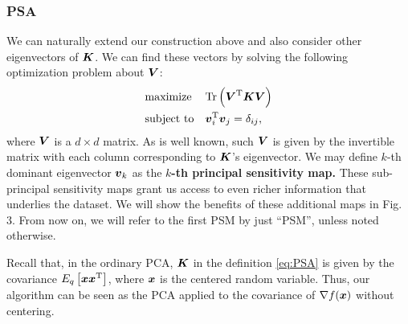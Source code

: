 \subsubsection{PSA}
%
We can naturally extend our construction above and also consider other
eigenvectors of $\mbox{\boldmath $K$}$.
%
We can find these vectors by solving the following optimization
problem about $\mbox{\boldmath $V$}$:
\begin{align}
\begin{split}
\begin{aligned}
& \text{maximize}
& & \mathrm{Tr}\left(\mbox{\boldmath $V$}^{\mathrm{T}} \mbox{\boldmath $K$} \mbox{\boldmath $V$}\right) \\
& \text{subject to}
& & \mbox{\boldmath $v$}_i^{\mathrm{T}}\mbox{\boldmath $v$}_j = \delta_{ij},
\end{aligned}
\end{split} \label{eq:PSA}
\end{align}
%
where $\mbox{\boldmath $V$}$ is a $d \times d$ matrix. As is well known, such $\mbox{\boldmath $V$}$ is given by
the invertible matrix with each column corresponding to $\mbox{\boldmath $K$}$'s
eigenvector.
%
We may define $k$-th dominant eigenvector $\mbox{\boldmath $v$}_{k}$ as
the \textbf{$k$-th principal sensitivity map.} These sub-principal sensitivity maps grant us
access to even richer information that underlies the dataset.
%
We will show the benefits of these additional maps in Fig.\,3.
From now on, we will refer to the first PSM by just ``PSM'', unless noted otherwise.

Recall that, in the ordinary PCA,  $\mbox{\boldmath $K$}$ in the definition \eqref{eq:PSA} is given by the covariance
$E_q\left[ \mbox{\boldmath $x$} \mbox{\boldmath $x$}^{\mathrm{T}} \right]$, where $\mbox{\boldmath $x$}$ is the
centered random variable.
%
Thus, our algorithm can be seen as the PCA
applied to the covariance of $\nabla f(\mbox{\boldmath $x$})$ without centering.

